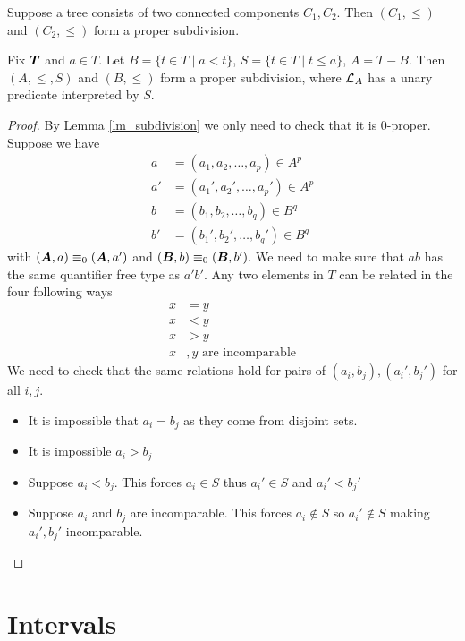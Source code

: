 \documentclass{amsart}
\DeclareMathOperator{\TT}{\boldface T}
\DeclareMathOperator{\A}{\boldface A}
\DeclareMathOperator{\B}{\boldface B}
\begin{document}
\begin{Example}
	Suppose a tree consists of two connected components $C_1, C_2$. Then $(C_1, \leq)$ and $(C_2, \leq)$ form a proper subdivision.
\end{Example}

\begin{Example} \label{ex_cone}
	Fix $\TT$ and $a \in T$. Let $B = \{t \in T \mid a < t\}$, $S = \{t \in T \mid t \leq a\}$, $A = T - B$. Then $(A, \leq, S)$ and $(B, \leq)$ form a proper subdivision, where $\mathcal L_A$ has a unary predicate interpreted by $S$.
\end{Example}

\begin{proof}
	By Lemma \ref{lm_subdivision} we only need to check that it is $0$-proper. Suppose we have 
	\begin{align*}
		a &= (a_1, a_2, \ldots, a_p) \in A^p \\
		a' &= (a_1', a_2', \ldots, a_p') \in A^p  \\
		b &= (b_1, b_2, \ldots, b_q) \in B^q  \\
		b' &= (b_1', b_2', \ldots, b_q') \in B^q 
	\end{align*}
	with $(\A, a) \equiv_0 (\A, a')$ and $(\B, b) \equiv_0 (\B, b')$. We need to make sure that $ab$ has the same quantifier free type as $a'b'$. Any two elements in $T$ can be related in the four following ways
	\begin{align*}
		x &= y \\
		x &< y \\
		x &> y \\
		x&,y \text{ are incomparable}
	\end{align*}
	We need to check that the same relations hold for pairs of $(a_i, b_j), (a_i', b_j')$ for all $i,j$.
	
	\begin{itemize}
		\item It is impossible that $a_i = b_j$ as they come from disjoint sets.
		\item It is impossible $a_i > b_j$
		\item Suppose $a_i < b_j$. This forces $a_i \in S$ thus $a_i' \in S$ and $a_i' < b_j'$ 
		\item Suppose $a_i$ and $b_j$ are incomparable. This forces $a_i \notin S$ so $a_i' \notin S$ making $a_i', b_j'$ incomparable.
	\end{itemize}
\end{proof}

\section{Intervals}
\end{document}
